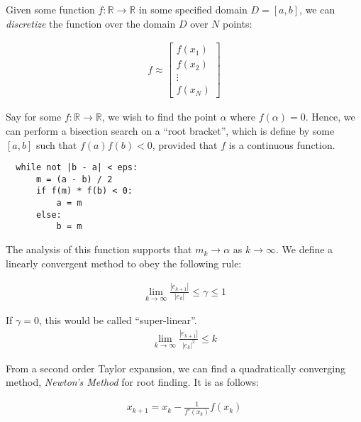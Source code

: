 \documentclass{article}
\newcommand{\R}{\mathbb{R}}
\begin{document}


 Given some function $f: \mathbb{R} \to \mathbb{R}$ in some specified domain $D = [a, b]$, we can \textit{discretize} the function over the domain $D$ over $N$ points:

\begin{align*}
    f \approx 
  \begin{bmatrix}
    f(x_1)\\
    f(x_2)\\
    \vdots\\
    f(x_N)
  \end{bmatrix}
\end{align*}

 Say for some $f: \R \to \R$, we wish to find the point $\alpha$ where $f(\alpha) = 0$.
\gap
Hence, we can perform a bisection search on a ``root bracket'', which is define by some $[a, b]$ such that $f(a)f(b) < 0$, provided that $f$ is a continuous function.
\gap


\begin{verbatim}
  while not |b - a| < eps:
      m = (a - b) / 2
      if f(m) * f(b) < 0:
          a = m
      else:
          b = m    
\end{verbatim}

The analysis of this function supports that $m_k \to \alpha$ as $k \to \infty$.
\gap
{} We define a linearly convergent method to obey the following rule:

\begin{align*}
  \lim_{k \to \infty} \frac{|e_{k+1}|}{|e_k|} \leq \gamma \leq 1
\end{align*}

If $\gamma = 0$, this would be called ``super-linear''.
\gap
{}
\begin{align*}
  \lim_{k \to \infty} \frac{|e_{k+1}|}{|e_k|^2} \leq k
\end{align*}

 From a second order Taylor expansion, we can find a quadratically converging method, \textit{Newton's Method} for root finding. It is as follows:

\begin{align*}
  x_{k + 1} = x_k - \frac{1}{f'(x_k)}f(x_k)
\end{align*}
\end{document}
